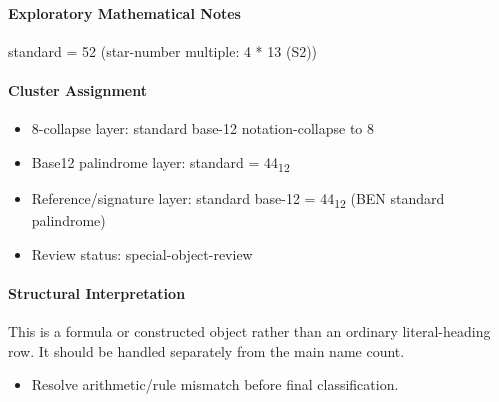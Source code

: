 \paragraph{Exploratory Mathematical Notes}
standard = 52 (star-number multiple: 4 * 13 (S2))
\paragraph{Cluster Assignment}
\begin{itemize}
\item 8-collapse layer: standard base-12 notation-collapse to 8
\item Base12 palindrome layer: standard = 44\textsubscript{12}
\item Reference/signature layer: standard base-12 = 44\textsubscript{12} (BEN standard palindrome)
\item Review status: special-object-review
\end{itemize}
\paragraph{Structural Interpretation}
This is a formula or constructed object rather than an ordinary literal-heading row. It should be handled separately from the main name count.

\begin{itemize}
\item Resolve arithmetic/rule mismatch before final classification.
\end{itemize}
